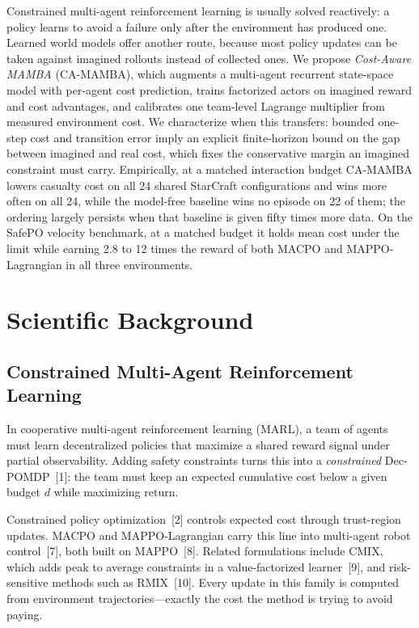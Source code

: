 \documentclass[12pt,a4paper]{article}
\begin{document}
Constrained multi-agent reinforcement learning is usually solved reactively: a policy learns to avoid a failure only after the environment has produced one.
Learned world models offer another route, because most policy updates can be taken against imagined rollouts instead of collected ones.
We propose \emph{Cost-Aware MAMBA} (CA-MAMBA), which augments a multi-agent recurrent state-space model with per-agent cost prediction, trains factorized actors on imagined reward and cost advantages, and calibrates one team-level Lagrange multiplier from measured environment cost.
We characterize when this transfers: bounded one-step cost and transition error imply an explicit finite-horizon bound on the gap between imagined and real cost, which fixes the conservative margin an imagined constraint must carry.
Empirically, at a matched interaction budget CA-MAMBA lowers casualty cost on all 24 shared StarCraft configurations and wins more often on all 24, while the model-free baseline wins no episode on 22 of them; the ordering largely persists when that baseline is given fifty times more data.
On the SafePO velocity benchmark, at a matched budget it holds mean cost under the limit while earning 2.8 to 12 times the reward of both MACPO and MAPPO-Lagrangian in all three environments.

\section{Scientific Background}

\subsection{Constrained Multi-Agent Reinforcement Learning}

In cooperative multi-agent reinforcement learning (MARL), a team of agents must learn decentralized policies that maximize a shared reward signal under partial observability.
Adding safety constraints turns this into a \emph{constrained} Dec-POMDP~[1]: the team must keep an expected cumulative cost below a given budget $d$ while maximizing return.

Constrained policy optimization~[2] controls expected cost through trust-region updates.
MACPO and MAPPO-Lagrangian carry this line into multi-agent robot control~[7], both built on MAPPO~[8].
Related formulations include CMIX, which adds peak to average constraints in a value-factorized learner~[9], and risk-sensitive methods such as RMIX~[10].
Every update in this family is computed from environment trajectories---exactly the cost the method is trying to avoid paying.
\end{document}
